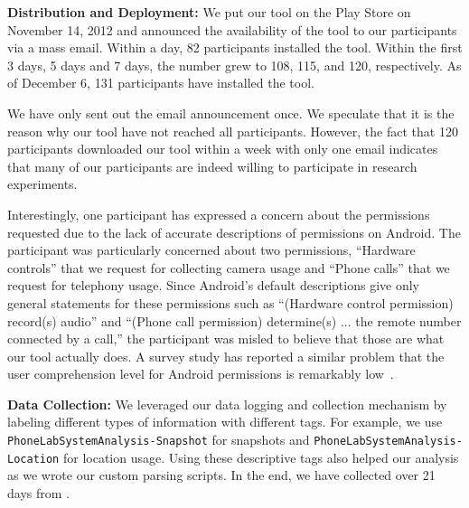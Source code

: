 {\bf Distribution and Deployment:} We put our tool on the Play Store on
November 14, 2012 and announced the availability of the tool to our
participants via a mass email. Within a day, 82 participants installed the
tool. Within the first 3 days, 5 days and 7 days, the number grew to 108,
115, and 120, respectively. As of December 6, 131 participants have installed
the tool. 

We have only sent out the email announcement once. We speculate that it is the
reason why our tool have not reached all participants. However, the fact that
120 participants downloaded our tool within a week with only one email indicates
that many of our participants are indeed willing to participate in research
experiments.

Interestingly, one participant has expressed a concern about the permissions
requested due to the lack of accurate descriptions of permissions on Android.
The participant was particularly concerned about two permissions, ``Hardware
controls'' that we request for collecting camera usage and ``Phone calls'' that
we request for telephony usage. Since Android's default descriptions give only
general statements for these permissions such as ``(Hardware control permission)
record(s) audio'' and ``(Phone call permission) determine(s) ... the remote
number connected by a call,'' the participant was misled to believe that those
are what our tool actually does. A survey study has reported a similar problem
that the user comprehension level for Android permissions is remarkably
low~\cite{felt:soups:2012}.

{\bf Data Collection:} We leveraged our data logging and collection mechanism by
labeling different types of information with different tags. For example,
we use \texttt{PhoneLabSystemAnalysis-Snapshot} for snapshots and
\texttt{PhoneLabSystemAnalysis-Location} for location usage. Using these
descriptive tags also helped our analysis as we wrote our custom parsing
scripts. In the end, we have collected  over 21 days from .
